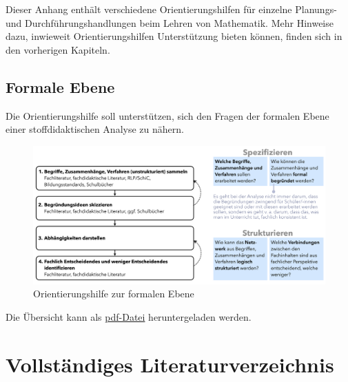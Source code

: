 \documentclass[
]{scrbook}
\theoremstyle{definition}
\theoremstyle{definition}
\theoremstyle{definition}
\theoremstyle{definition}
\theoremstyle{remark}
\begin{document}
Dieser Anhang enthält verschiedene Orientierungshilfen für einzelne Planungs- und Durchführungshandlungen beim Lehren von Mathematik. Mehr Hinweise dazu, inwieweit Orientierungshilfen Unterstützung bieten können, finden sich in den vorherigen Kapiteln.

\section{Formale Ebene}\label{formale-ebene-1}

Die Orientierungshilfe soll unterstützen, sich den Fragen der formalen Ebene einer stoffdidaktischen Analyse zu nähern.

\begin{figure}

{\centering \includegraphics[width=0.9\linewidth]{pictures/B-OrientierungshilfeFormaleEbene} 

}

\caption{Orientierungshilfe zur formalen Ebene}\label{fig:OrientierungFormal}
\end{figure}

Die Übersicht kann als \href{files/Stoffdidaktik2024-OrientierungshilfeFormaleEbene.pdf}{pdf-Datei} heruntergeladen werden.

\chapter{Vollständiges Literaturverzeichnis}\label{vollstuxe4ndiges-literaturverzeichnis}
\end{document}
